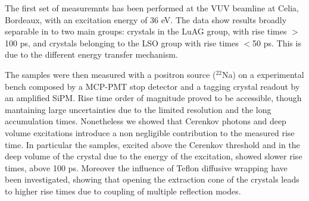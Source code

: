 The first set of measuremnts has been performed at the VUV beamline at Celia, Bordeaux, with an excitation energy of 36 eV. 
The data show results broadly separable in to two main groups: crystals in the LuAG group, with rise times $>$100 ps, and crystals belonging to the LSO group with rise times $<$50 ps. This is due to the different energy transfer mechanism.

The samples were then measured with a positron source ($^{22}$Na) on a experimental bench composed by a MCP-PMT stop detector and a tagging crystal readout by an amplified SiPM.
Rise time order of magnitude proved to be accessible, though mantaining large uncertainties due to the limited resolution and the long accumulation times.
Nonetheless we showed that Cerenkov photons and deep volume excitations introduce a non negligible contribution to the measured rise time. In particular the samples, excited above the Cerenkov threshold and in the deep volume of the crystal due to the energy of the excitation, showed slower rise times, above 100 ps.
Moreover the influence of Teflon diffusive wrapping have been investigated, showing that opening the extraction cone of the crystals leads to higher rise times due to coupling of multiple reflection modes.

